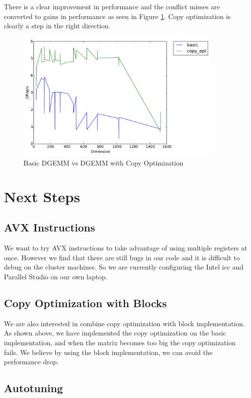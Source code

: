 \documentclass[11pt]{article}
\theoremstyle{plain}
\theoremstyle{definition}
\begin{document}
There is a clear improvement in performance and the conflict misses are converted to gains in performance as seen in Figure \ref{basic_copy_opt}. Copy optimization is clearly a step in the right direction. 


\begin{figure}[H]
    \includegraphics[width=0.9\textwidth]{timing_basic_vs_copy_opt.pdf}
    \caption{Basic DGEMM vs DGEMM with Copy Optimization}
    \label{basic_copy_opt}
\end{figure} 


\section{Next Steps}

\subsection{AVX Instructions}
We want to try AVX instructions to take advantage of using multiple registers at once. However we find that there are still bugs in our code and it is difficult to debug on the cluster machines. So we are currently configuring the Intel icc and Parallel Studio on our own laptop.

\subsection{Copy Optimization with Blocks}
We are also interested in combine copy optimization with block implementation. As shown above, we have implemented the copy optimization on the basic implementation, and when the matrix becomes too big the copy optimization fails. We believe by using the block implementation, we can avoid the performance drop.

\subsection{Autotuning}





 
 
\end{document}
